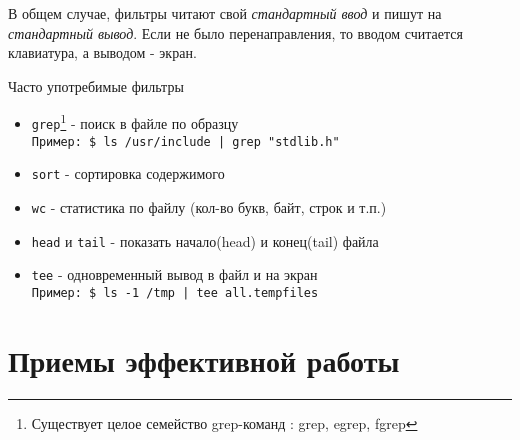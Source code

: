 В общем случае, фильтры читают свой \emph{стандартный ввод} и пишут на \emph{стандартный вывод}. Если не было перенаправления, то вводом считается клавиатура, а выводом - экран.
\begin{center}
Часто употребимые фильтры
\end{center}
\begin{itemize}
\item \verb+grep+\footnote{Существует целое семейство grep-команд : grep, egrep, fgrep} - поиск в файле по образцу
\\ \verb+Пример: $ ls /usr/include | grep "stdlib.h" +
\item \verb+sort+ - сортировка содержимого
\item \verb+wc+ - статистика по файлу (кол-во букв, байт, строк и т.п.)
\item \verb+head+ и \verb+tail+ - показать начало(head) и конец(tail) файла
\item \verb+tee+ - одновременный вывод в файл и на экран
\\ \verb+Пример: $ ls -1 /tmp | tee all.tempfiles+
\end{itemize}

\section{Приемы эффективной работы}

